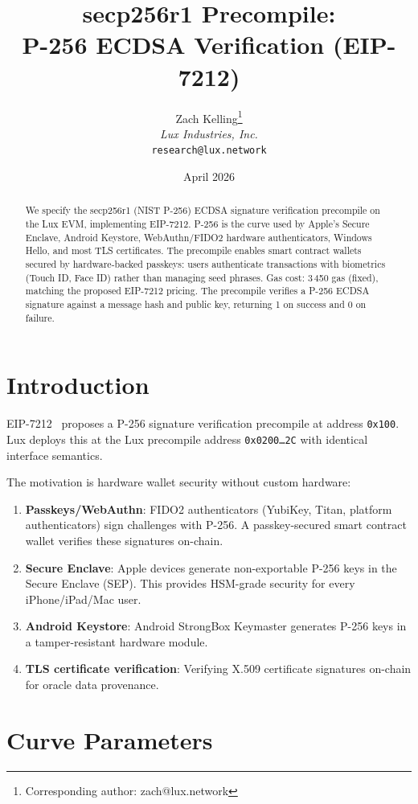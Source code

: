 \documentclass[11pt,a4paper]{article}
\title{secp256r1 Precompile:\\P-256 ECDSA Verification (EIP-7212)}
\author{
Zach Kelling\thanks{Corresponding author: zach@lux.network}\\
\textit{Lux Industries, Inc.}\\
\texttt{research@lux.network}
}
\date{April 2026}
\begin{document}
\luxcoverpage

\begin{abstract}
We specify the secp256r1 (NIST P-256) ECDSA signature verification precompile
on the Lux EVM, implementing EIP-7212. P-256 is the curve used by Apple's
Secure Enclave, Android Keystore, WebAuthn/FIDO2 hardware authenticators,
Windows Hello, and most TLS certificates. The precompile enables smart contract
wallets secured by hardware-backed passkeys: users authenticate transactions
with biometrics (Touch ID, Face ID) rather than managing seed phrases. Gas cost:
3\,450 gas (fixed), matching the proposed EIP-7212 pricing. The precompile
verifies a P-256 ECDSA signature against a message hash and public key, returning
1 on success and 0 on failure.
\end{abstract}

\section{Introduction}

EIP-7212~\cite{eip7212} proposes a P-256 signature verification precompile at
address \texttt{0x100}. Lux deploys this at the Lux precompile address
\texttt{0x0200\ldots2C} with identical interface semantics.

The motivation is hardware wallet security without custom hardware:
\begin{enumerate}[label=(\roman*)]
  \item \textbf{Passkeys/WebAuthn}: FIDO2 authenticators (YubiKey, Titan,
    platform authenticators) sign challenges with P-256. A passkey-secured
    smart contract wallet verifies these signatures on-chain.
  \item \textbf{Secure Enclave}: Apple devices generate non-exportable P-256
    keys in the Secure Enclave (SEP). This provides HSM-grade security for
    every iPhone/iPad/Mac user.
  \item \textbf{Android Keystore}: Android StrongBox Keymaster generates
    P-256 keys in a tamper-resistant hardware module.
  \item \textbf{TLS certificate verification}: Verifying X.509 certificate
    signatures on-chain for oracle data provenance.
\end{enumerate}

\section{Curve Parameters}
\end{document}
